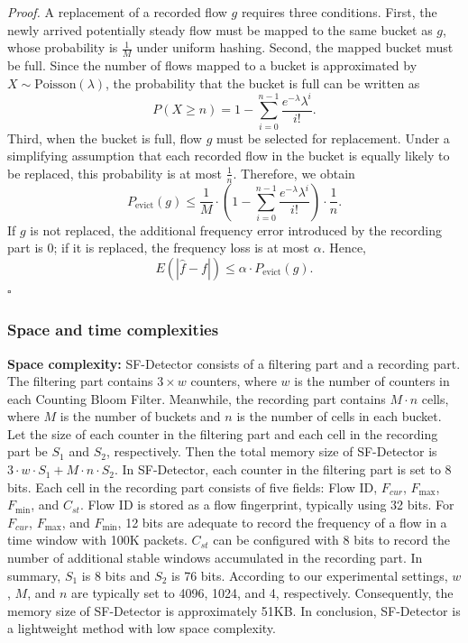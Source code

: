 \documentclass[preprint,12pt]{elsarticle}
\begin{document}
\textit{Proof.} A replacement of a recorded flow $g$ requires three conditions. First, the newly arrived potentially steady flow must be mapped to the same bucket as $g$, whose probability is $\frac{1}{M}$ under uniform hashing. Second, the mapped bucket must be full. Since the number of flows mapped to a bucket is approximated by $X \sim \text{Poisson}(\lambda)$, the probability that the bucket is full can be written as
\begin{equation}
    P(X \ge n) = 1 - \sum_{i=0}^{n-1}\frac{e^{-\lambda}\lambda^i}{i!}.
\end{equation}
Third, when the bucket is full, flow $g$ must be selected for replacement. Under a simplifying assumption that each recorded flow in the bucket is equally likely to be replaced, this probability is at most $\frac{1}{n}$. Therefore, we obtain
\begin{equation}
    P_{\text{evict}}(g) \le \frac{1}{M} \cdot \left(1 - \sum_{i=0}^{n-1}\frac{e^{-\lambda}\lambda^i}{i!}\right) \cdot \frac{1}{n}.
\end{equation}
If $g$ is not replaced, the additional frequency error introduced by the recording part is 0; if it is replaced, the frequency loss is at most $\alpha$. Hence,
\begin{equation}
    E\left(|\hat{f} - f|\right) \le \alpha \cdot P_{\text{evict}}(g).
\end{equation}
\hfill $\square$

\subsubsection{Space and time complexities}

\textbf{Space complexity:} SF-Detector consists of a filtering part and a recording part. The filtering part contains $3 \times w$ counters, where $w$ is the number of counters in each Counting Bloom Filter. Meanwhile, the recording part contains $M \cdot n$ cells, where $M$ is the number of buckets and $n$ is the number of cells in each bucket. Let the size of each counter in the filtering part and each cell in the recording part be $S_1$ and $S_2$, respectively. Then the total memory size of SF-Detector is $3 \cdot w \cdot S_1 + M \cdot n \cdot S_2$. In SF-Detector, each counter in the filtering part is set to 8 bits. Each cell in the recording part consists of five fields: Flow ID, $F_{cur}$, $F_{\max}$, $F_{\min}$, and $C_{st}$. Flow ID is stored as a flow fingerprint, typically using 32 bits. For $F_{cur}$, $F_{\max}$, and $F_{\min}$, 12 bits are adequate to record the frequency of a flow in a time window with 100K packets. $C_{st}$ can be configured with 8 bits to record the number of additional stable windows accumulated in the recording part. In summary, $S_1$ is 8 bits and $S_2$ is 76 bits. According to our experimental settings, $w$, $M$, and $n$ are typically set to 4096, 1024, and 4, respectively. Consequently, the memory size of SF-Detector is approximately 51KB. In conclusion, SF-Detector is a lightweight method with low space complexity.
\end{document}
